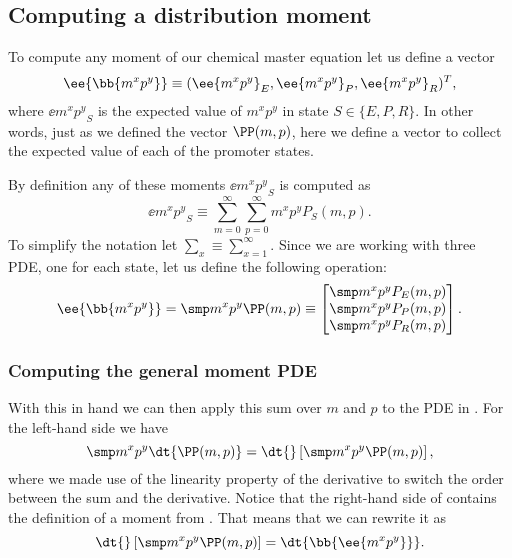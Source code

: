 \subsection{Computing a distribution moment}

To compute any moment of our chemical master equation let us define a vector
\begin{equation}
  \ee{\bb{m^x p^y}} \equiv (\ee{m^x p^y}_E, \ee{m^x p^y}_P, \ee{m^x p^y}_R)^T,
\end{equation}
where $\ee{m^x p^y}_S$ is the expected value of $m^x p^y$ in state $S \in
\{E, P, R\}$. In other words, just as we defined the vector $\PP(m, p)$, here
we define a vector to collect the expected value of each of the promoter states.

By definition any of these moments $\ee{m^x p^y}_S$ is computed as
\begin{equation}
  \ee{m^x p^y}_S \equiv \sum_{m=0}^\infty \sum_{p=0}^\infty m^x p^y P_S(m, p).
  \label{eq_mom_def}
\end{equation}
To simplify the notation let $\sum_x \equiv \sum_{x=1}^\infty$. Since we are
working with three PDE, one for each state, let us define the following
operation:
\begin{equation}
  \ee{\bb{m^x p^y}} =
  \smp m^x p^y \PP(m, p) \equiv
  \begin{bmatrix}
    \smp m^x p^y P_E(m, p)\\
    \smp m^x p^y P_P(m, p)\\
    \smp m^x p^y P_R(m, p)\\
  \end{bmatrix}.
\end{equation}

\subsubsection{Computing the general moment PDE}

With this in hand we can then apply this sum over $m$ and $p$ to the PDE in
. For the left-hand side we have
\begin{equation}
  \smp m^x p^y \dt{\PP(m, p)} = \dt{}\left[ \smp m^x p^y \PP(m, p) \right],
  \label{eq_sum_mom}
\end{equation}
where we made use of the linearity property of the derivative to switch the
order between the sum and the derivative. Notice that the right-hand side of
 contains the definition of a moment from .
That means that we can rewrite it as
\begin{equation}
  \dt{}\left[ \smp m^x p^y \PP(m, p) \right] = \dt{\bb{\ee{m^x p^y}}}.
\end{equation}

